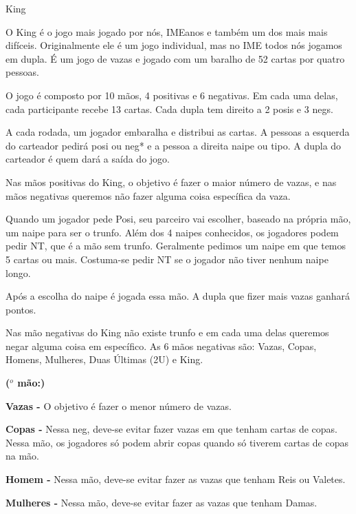 \begin{subsecao}{King}

O King é o jogo mais jogado por nós, IMEanos e também um dos mais mais difíceis.
Originalmente ele é um jogo individual, mas no IME todos nós jogamos em
dupla. É um jogo de vazas e jogado com um baralho de 52 cartas por quatro
pessoas.

O jogo é composto por 10 mãos, 4 positivas e 6 negativas. Em cada uma delas,
cada participante recebe 13 cartas. Cada dupla tem direito a 2 posis e 3 negs.

A cada rodada, um jogador embaralha e distribui as cartas. A pessoas a esquerda
do carteador pedirá posi ou neg* e a pessoa a direita naipe ou tipo. A dupla do
carteador é quem dará a saída do jogo.

Nas mãos positivas do King, o objetivo é fazer o maior número de vazas, e nas
mãos negativas queremos não fazer alguma coisa específica da vaza.

Quando um jogador pede Posi, seu parceiro vai escolher, baseado na própria mão,
um naipe para ser o trunfo. Além dos 4 naipes conhecidos,  os jogadores podem
pedir NT, que é a mão sem trunfo. Geralmente pedimos um naipe em que temos 5
cartas ou mais. Costuma-se pedir NT se o jogador não tiver nenhum naipe longo.

Após a escolha do naipe é jogada essa mão. A dupla que fizer mais vazas ganhará
pontos.

Nas mão negativas do King não existe trunfo e em cada uma delas queremos negar
alguma coisa em específico. As 6 mãos negativas são: Vazas, Copas, Homens,
Mulheres, Duas Últimas (2U) e King.


\begin{list}{\textbf{ ($^{o}$ mão:)}}{}

\item \textbf{Vazas -} O objetivo é fazer o menor número de vazas.

\item \textbf{Copas -}  Nessa neg, deve-se evitar fazer vazas em que tenham
cartas de copas. Nessa mão, os jogadores só podem abrir copas quando só tiverem
cartas de copas na mão.

\item \textbf{Homem -} Nessa mão, deve-se evitar fazer as vazas que tenham Reis
ou Valetes.

\item \textbf{Mulheres -} Nessa mão, deve-se evitar fazer as vazas que tenham
Damas.


\end{list}
\end{subsecao}
